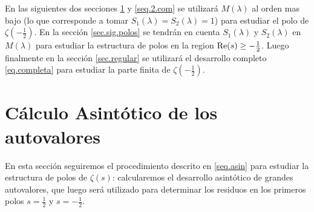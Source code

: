 En las siguientes dos secciones \ref{seq.2.asin} y \ref{seq.2.com} se utilizará $M ( \lambda )$ al orden mas bajo (lo que corresponde a tomar $S _1 (\lambda) = S _2 ( \lambda )= 1$) para estudiar el polo de $\zeta \left( - \frac{1}{2} \right)$. En la sección \ref{sec.sig.polos} se tendrán en cuenta $S _1 (\lambda)$ y $S _2 ( \lambda )$ en $M ( \lambda)$ para estudiar la estructura de polos en la region ${\rm Re }(s) \geq - \frac{1}{2}$.
Luego finalmente en la sección \ref{sec.regular} se utilizará el desarrollo completo \eqref{eq.completa} para estudiar la parte finita de $\zeta \left( - \frac{1}{2} \right)$.

\section{Cálculo Asintótico de los autovalores}\label{seq.2.asin}

En esta sección seguiremos el procedimiento descrito en \ref{seq.asin} para estudiar la estructura de polos de $\zeta (s)$: calcularemos el desarrollo asintótico de grandes autovalores, que luego será utilizado para determinar los residuos en los primeros polos $s= \frac{1}{2}$ y $s= - \frac{1}{2}$.



